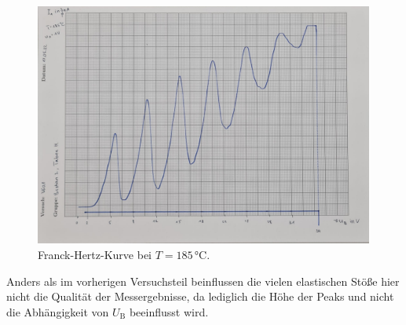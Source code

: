 \begin{figure}[H]
  \centering
  \includegraphics[height=8cm]{Messwerte/d.jpg}
  \caption{Franck-Hertz-Kurve bei $T=185\,\si{\celsius}$.}
  \label{Abb:d}
\end{figure}

Anders als im vorherigen Versuchsteil beinflussen die vielen elastischen Stöße hier nicht
die Qualität der Messergebnisse, da lediglich die Höhe der Peaks und nicht die Abhängigkeit
von $U_{\mathrm{B}}$ beeinflusst wird.